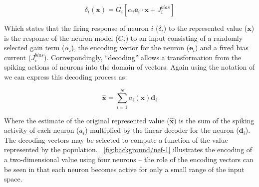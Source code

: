 \documentclass[conference]{IEEEtran}
\renewcommand{\vec}{\mathbf}  %
\begin{document}
\begin{equation}
  \delta_{i}\left(\vec{x}\right) = G_{i}\left[ \alpha_i \vec{e}_i \cdot \vec{x} + J^{bias}_i \right]
  \label{eq:encoding}
\end{equation}

Which states that the firing response of neuron $i$ ($\delta_i$) to the represented value ($\vec{x}$) is the response of the neuron model ($G_{i}$) to an input consisting of a randomly selected gain term ($\alpha_i$), the encoding vector for the neuron ($\vec{e}_i$) and a fixed bias current ($J^{bias}_i$).
Correspondingly, ``decoding'' allows a transformation from the spiking actions of neurons into the domain of vectors.
Again using the notation of \textcite{Stewart2014} we can express this decoding process as:

\begin{equation}
  \vec{\hat{x}} = \sum\limits_{i=1}^{N} a_i(\vec{x})\vec{d}_i  \label{eq:decoding}
\end{equation}

Where the estimate of the original represented value ($\vec{\hat{x}}$) is the sum of the spiking activity of each neuron ($a_i$) multiplied by the linear decoder for the neuron ($\vec{d}_i$).
The decoding vectors may be selected to compute a function of the value represented by the population.
\figurename~\ref{fig:background/nef-1} illustrates the encoding of a two-dimensional value using four neurons -- the role of the encoding vectors can be seen in that each neuron becomes active for only a small range of the input space.
\end{document}
